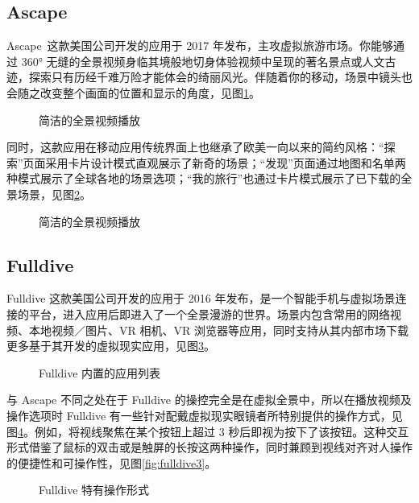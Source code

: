 \subsection{Ascape}

Ascape 这款美国公司开发的应用于 2017 年发布，主攻虚拟旅游市场。你能够通过 360° 无缝的全景视频身临其境般地切身体验视频中呈现的著名景点或人文古迹，探索只有历经千难万险才能体会的绮丽风光。伴随着你的移动，场景中镜头也会随之改变整个画面的位置和显示的角度，见图\ref{fig:ascape1}。

\begin{figure}[htp]
\centering
{}
\caption{简洁的全景视频播放}
\label{fig:ascape1}
\end{figure}

同时，这款应用在移动应用传统界面上也继承了欧美一向以来的简约风格：“探索”页面采用卡片设计模式直观展示了新奇的场景；“发现”页面通过地图和名单两种模式展示了全球各地的场景选项；“我的旅行”也通过卡片模式展示了已下载的全景场景，见图\ref{fig:ascape2}。

\begin{figure}[htp]
\centering
{}
\caption{简洁的全景视频播放}
\label{fig:ascape2}
\end{figure}

\subsection{Fulldive}

Fulldive 这款美国公司开发的应用于 2016 年发布，是一个智能手机与虚拟场景连接的平台，进入应用后即进入了一个全景漫游的世界。场景内包含常用的网络视频、本地视频／图片、VR 相机、VR 浏览器等应用，同时支持从其内部市场下载更多基于其开发的虚拟现实应用，见图\ref{fig:fulldive1}。

\begin{figure}[htp]
\centering
{}
\caption{Fulldive 内置的应用列表}
\label{fig:fulldive1}
\end{figure}

与 Ascape 不同之处在于 Fulldive 的操控完全是在虚拟全景中，所以在播放视频及操作选项时 Fulldive 有一些针对配戴虚拟现实眼镜者所特别提供的操作方式，见图\ref{fig:fulldive2}。例如，将视线聚焦在某个按钮上超过 3 秒后即视为按下了该按钮。这种交互形式借鉴了鼠标的双击或是触屏的长按这两种操作，同时兼顾到视线对齐对人操作的便捷性和可操作性，见图\ref{fig:fulldive3}。

\begin{figure}[htp]
\centering
{}
\caption{Fulldive 特有操作形式}
\label{fig:fulldive2}
\end{figure}

